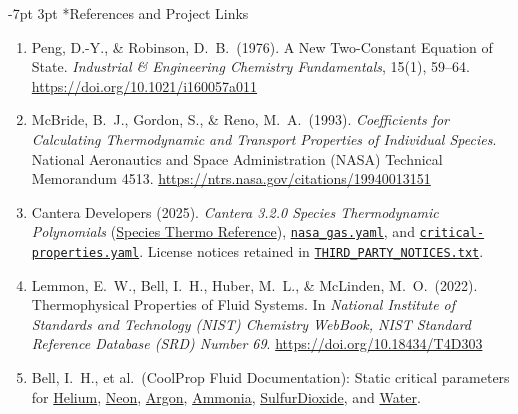 \documentclass[10pt,a4paper]{article}
\makeatletter
\renewcommand\section{\@startsection {section}{1}{\z@}%
  {-7pt \@plus -2pt \@minus -1pt}%
  {3pt \@plus 1pt}%
  {\normalfont\large\bfseries\color{darkslate}}}
\makeatother
\begin{document}
\section*{References and Project Links}
\vspace{-2pt}
{\footnotesize
\begin{enumerate}\setlength{\itemsep}{1pt}\setlength{\parskip}{0pt}
  \item Peng, D.-Y., \& Robinson, D.\ B.\ (1976). A New Two-Constant Equation of State. \textit{Industrial \& Engineering Chemistry Fundamentals}, 15(1), 59--64. \href{https://doi.org/10.1021/i160057a011}{https://doi.org/10.1021/i160057a011}
  \item McBride, B.\ J., Gordon, S., \& Reno, M.\ A.\ (1993). \textit{Coefficients for Calculating Thermodynamic and Transport Properties of Individual Species}. National Aeronautics and Space Administration (NASA) Technical Memorandum 4513. \href{https://ntrs.nasa.gov/citations/19940013151}{https://ntrs.nasa.gov/citations/19940013151}
  \item Cantera Developers (2025). \textit{Cantera 3.2.0 Species Thermodynamic Polynomials} (\href{https://www.cantera.org/stable/reference/thermo/species-thermo.html}{Species Thermo Reference}), \href{https://github.com/Cantera/cantera/blob/v3.2.0/data/nasa_gas.yaml}{\texttt{nasa\_gas.yaml}}, and \href{https://github.com/Cantera/cantera/blob/v3.2.0/data/critical-properties.yaml}{\texttt{critical-properties.yaml}}. License notices retained in \href{https://github.com/satwikgupta122/realgas_ml/blob/main/THIRD_PARTY_NOTICES.txt}{\texttt{THIRD\_PARTY\_NOTICES.txt}}.
  \item Lemmon, E.\ W., Bell, I.\ H., Huber, M.\ L., \& McLinden, M.\ O.\ (2022). Thermophysical Properties of Fluid Systems. In \textit{National Institute of Standards and Technology (NIST) Chemistry WebBook, NIST Standard Reference Database (SRD) Number 69}. \href{https://doi.org/10.18434/T4D303}{https://doi.org/10.18434/T4D303}
  \item Bell, I.\ H., et al.\ (CoolProp Fluid Documentation): Static critical parameters for \href{https://coolprop.org/fluid_properties/fluids/Helium.html}{Helium}, \href{https://coolprop.org/fluid_properties/fluids/Neon.html}{Neon}, \href{https://coolprop.org/fluid_properties/fluids/Argon.html}{Argon}, \href{https://coolprop.org/fluid_properties/fluids/Ammonia.html}{Ammonia}, \href{https://coolprop.org/fluid_properties/fluids/SulfurDioxide.html}{SulfurDioxide}, and \href{https://coolprop.org/fluid_properties/fluids/Water.html}{Water}.

\end{enumerate}}
\end{document}
